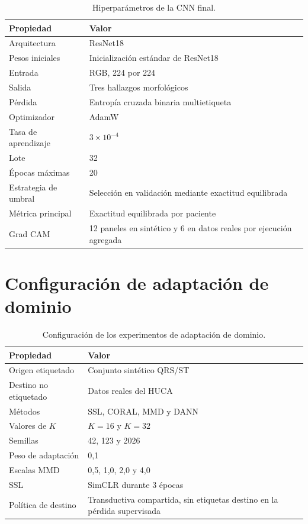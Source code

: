 \begin{table}[H]
  \centering
  \small
  \begin{tabularx}{0.94\textwidth}{p{4.4cm}X}
    \toprule
    Propiedad & Valor \\
    \midrule
    Arquitectura & ResNet18 \\
    Pesos iniciales & Inicialización estándar de ResNet18 \\
    Entrada & RGB, 224 por 224 \\
    Salida & Tres hallazgos morfológicos \\
    Pérdida & Entropía cruzada binaria multietiqueta \\
    Optimizador & AdamW \\
    Tasa de aprendizaje & \(3\times10^{-4}\) \\
    Lote & 32 \\
    Épocas máximas & 20 \\
    Estrategia de umbral & Selección en validación mediante exactitud equilibrada \\
    Métrica principal & Exactitud equilibrada por paciente \\
    Grad CAM & 12 paneles en sintético y 6 en datos reales por ejecución agregada \\
    \bottomrule
  \end{tabularx}
  \caption{Hiperparámetros de la CNN final.}
  \label{tab:config_cnn_appendix}
\end{table}

\section{Configuración de adaptación de dominio}

\begin{table}[H]
  \centering
  \small
  \begin{tabularx}{0.94\textwidth}{p{4.4cm}X}
    \toprule
    Propiedad & Valor \\
    \midrule
    Origen etiquetado & Conjunto sintético QRS/ST \\
    Destino no etiquetado & Datos reales del HUCA \\
    Métodos & SSL, CORAL, MMD y DANN \cite{chen2020simclr,sun2016deepcoral,long2015dan,ganin2016} \\
    Valores de \(K\) & \(K=16\) y \(K=32\) \\
    Semillas & 42, 123 y 2026 \\
    Peso de adaptación & 0,1 \\
    Escalas MMD & 0,5, 1,0, 2,0 y 4,0 \\
    SSL & SimCLR durante 3 épocas \\
    Política de destino & Transductiva compartida, sin etiquetas destino en la pérdida supervisada \\
    \bottomrule
  \end{tabularx}
  \caption{Configuración de los experimentos de adaptación de dominio.}
  \label{tab:config_domain_appendix}
\end{table}


